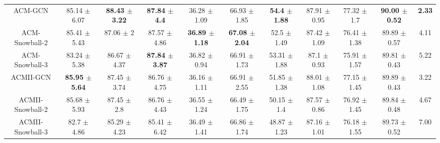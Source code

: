 \documentclass{article}
\newcommand{\0}{{\boldsymbol{0}}}
\newcommand{\6}{{\partial}}
\newcommand{\8}{{\infty}}
\newcommand{\4}{{\nabla}}
\begin{document}
\begin{table}[htbp]
{\begin{tabular}{c|ccccccccc|c}
    ACM-GCN & 85.14 $\pm$ 6.07 & \cellcolor[rgb]{ .816,  .808,  .808}\textbf{88.43 $\pm$ 3.22} & \cellcolor[rgb]{ .816,  .808,  .808}\textbf{87.84 $\pm$ 4.4} & 36.28 $\pm$ 1.09 & 66.93 $\pm$ 1.85 & \cellcolor[rgb]{ .816,  .808,  .808}\textbf{54.4 $\pm$ 1.88} & 87.91 $\pm$ 0.95 & 77.32 $\pm$ 1.7 & \cellcolor[rgb]{ .816,  .808,  .808}\textbf{90.00 $\pm$ 0.52} & \cellcolor[rgb]{ .816,  .808,  .808}\textbf{2.33} \\
    ACM-Snowball-2 & 85.41 $\pm$ 5.43 & 87.06 $\pm$ 2 & 87.57 $\pm$ 4.86 & \cellcolor[rgb]{ .816,  .808,  .808}\textbf{36.89 $\pm$ 1.18} & \cellcolor[rgb]{ .816,  .808,  .808}\textbf{67.08 $\pm$ 2.04} & 52.5 $\pm$ 1.49 & 87.42 $\pm$ 1.09 & 76.41 $\pm$ 1.38 & 89.89 $\pm$ 0.57 & 4.11 \\
    ACM-Snowball-3 & 83.24 $\pm$ 5.38 & 86.67 $\pm$ 4.37 & \cellcolor[rgb]{ .816,  .808,  .808}\textbf{87.84 $\pm$ 3.87} & 36.82 $\pm$ 0.94 & 66.91 $\pm$ 1.73 & 53.31 $\pm$ 1.88 & 87.1 $\pm$ 0.93 & 75.91 $\pm$ 1.57 & 89.81 $\pm$ 0.43 & 5.22 \\
    ACMII-GCN & \cellcolor[rgb]{ .816,  .808,  .808}\textbf{85.95 $\pm$ 5.64} & 87.45 $\pm$ 3.74 & 86.76 $\pm$ 4.75 & 36.16 $\pm$ 1.11 & 66.91 $\pm$ 2.55 & 51.85 $\pm$ 1.38 & 88.01 $\pm$ 1.08 & 77.15 $\pm$ 1.45 & 89.89 $\pm$ 0.43 & 3.22 \\
    ACMII-Snowball-2 & 85.68 $\pm$ 5.93 & 87.45 $\pm$ 2.8 & 86.76 $\pm$ 4.43 & 36.55 $\pm$ 1.24 & 66.49 $\pm$ 1.75 & 50.15 $\pm$ 1.4 & 87.57 $\pm$ 0.86 & 76.92 $\pm$ 1.45 & 89.84 $\pm$ 0.48 & 4.67 \\
    ACMII-Snowball-3 & 82.7 $\pm$ 4.86 & 85.29 $\pm$ 4.23 & 85.41 $\pm$ 6.42 & 36.49 $\pm$ 1.41 & 66.86 $\pm$ 1.74 & 48.87 $\pm$ 1.23 & 87.16 $\pm$ 1.01 & 76.18 $\pm$ 1.55 & 89.73 $\pm$ 0.52 & 7.00 \\
    \bottomrule
    \bottomrule
    \end{tabular}}
  \label{tab:performance_comparison_fixed_splits}\end{table} \begin{table}[htbp]
  \centering
  \caption{Hyperparameters for FAGCN and ACM-GNNs on fixed splits}
\end{table}
\end{document}
